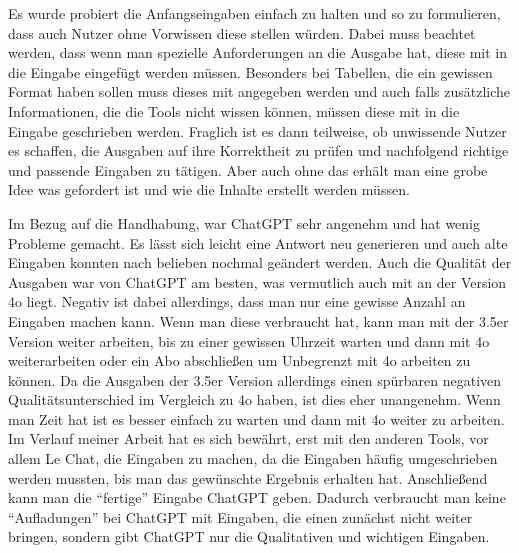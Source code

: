 Es wurde probiert die Anfangseingaben einfach zu halten und so zu formulieren, dass auch Nutzer ohne Vorwissen 
diese stellen würden. Dabei muss beachtet werden, dass wenn man spezielle Anforderungen an die Ausgabe hat, 
diese mit in die Eingabe eingefügt werden müssen. Besonders bei Tabellen, die ein gewissen Format haben sollen 
muss dieses mit angegeben werden und auch falls zusätzliche Informationen, die die Tools nicht wissen können,
müssen diese mit in die Eingabe geschrieben werden. Fraglich ist es dann teilweise, ob unwissende Nutzer es 
schaffen, die Ausgaben auf ihre Korrektheit zu prüfen und nachfolgend richtige und passende Eingaben zu tätigen.
Aber auch ohne das erhält man eine grobe Idee was gefordert ist und wie die Inhalte erstellt werden müssen. 

Im Bezug auf die Handhabung, war ChatGPT sehr angenehm und hat wenig Probleme gemacht. Es lässt sich leicht 
eine Antwort neu generieren und auch alte Eingaben konnten nach belieben nochmal geändert werden. Auch die 
Qualität der Ausgaben war von ChatGPT am besten, was vermutlich auch mit an der Version 4o liegt. Negativ ist 
dabei allerdings, dass man nur eine gewisse Anzahl an Eingaben machen kann. Wenn man diese verbraucht hat, kann 
man mit der 3.5er Version weiter arbeiten, bis zu einer gewissen Uhrzeit warten und dann mit 4o weiterarbeiten oder 
ein Abo abschließen um Unbegrenzt mit 4o arbeiten zu können. Da die Ausgaben der 3.5er Version allerdings einen spürbaren 
negativen Qualitätsunterschied im Vergleich zu 4o haben, ist dies eher unangenehm. Wenn man Zeit hat ist es besser 
einfach zu warten und dann mit 4o weiter zu arbeiten. Im Verlauf meiner Arbeit hat es sich bewährt, erst mit 
den anderen Tools, vor allem Le Chat, die Eingaben zu machen, da die Eingaben häufig umgeschrieben werden mussten, bis man
das gewünschte Ergebnis erhalten hat. Anschließend kann man die ``fertige'' Eingabe ChatGPT geben. Dadurch verbraucht man 
keine ``Aufladungen'' bei ChatGPT mit Eingaben, die einen zunächst nicht weiter bringen, sondern gibt ChatGPT nur die 
Qualitativen und wichtigen Eingaben.

